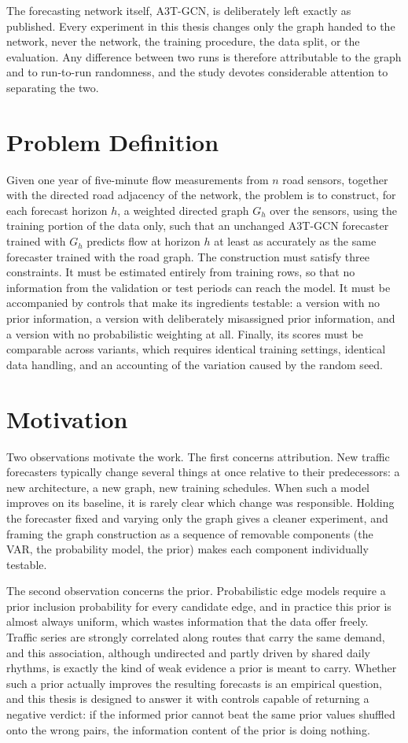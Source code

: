 \documentclass[MTech]{ugthesis}
\begin{document}
The forecasting network itself, A3T-GCN, is deliberately left exactly as published. Every experiment in this thesis changes only the graph handed to the network, never the network, the training procedure, the data split, or the evaluation. Any difference between two runs is therefore attributable to the graph and to run-to-run randomness, and the study devotes considerable attention to separating the two.

\section{Problem Definition}
Given one year of five-minute flow measurements from $n$ road sensors, together with the directed road adjacency of the network, the problem is to construct, for each forecast horizon $h$, a weighted directed graph $G_h$ over the sensors, using the training portion of the data only, such that an unchanged A3T-GCN forecaster trained with $G_h$ predicts flow at horizon $h$ at least as accurately as the same forecaster trained with the road graph. The construction must satisfy three constraints. It must be estimated entirely from training rows, so that no information from the validation or test periods can reach the model. It must be accompanied by controls that make its ingredients testable: a version with no prior information, a version with deliberately misassigned prior information, and a version with no probabilistic weighting at all. Finally, its scores must be comparable across variants, which requires identical training settings, identical data handling, and an accounting of the variation caused by the random seed.

\section{Motivation}
Two observations motivate the work. The first concerns attribution. New traffic forecasters typically change several things at once relative to their predecessors: a new architecture, a new graph, new training schedules. When such a model improves on its baseline, it is rarely clear which change was responsible. Holding the forecaster fixed and varying only the graph gives a cleaner experiment, and framing the graph construction as a sequence of removable components (the VAR, the probability model, the prior) makes each component individually testable.

The second observation concerns the prior. Probabilistic edge models require a prior inclusion probability for every candidate edge, and in practice this prior is almost always uniform, which wastes information that the data offer freely. Traffic series are strongly correlated along routes that carry the same demand, and this association, although undirected and partly driven by shared daily rhythms, is exactly the kind of weak evidence a prior is meant to carry. Whether such a prior actually improves the resulting forecasts is an empirical question, and this thesis is designed to answer it with controls capable of returning a negative verdict: if the informed prior cannot beat the same prior values shuffled onto the wrong pairs, the information content of the prior is doing nothing.
\end{document}
